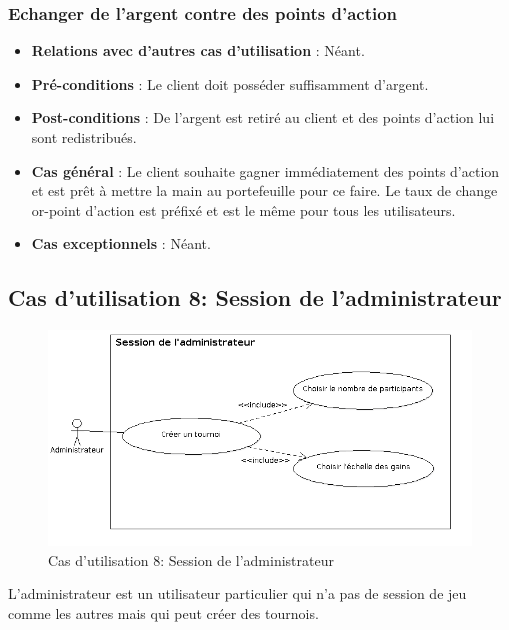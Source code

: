 \documentclass[a4paper,titlepage]{scrreprt}
\begin{document}
    \subsubsection{Echanger de l'argent contre des points d'action}
      \begin{itemize}
        \item \textbf{Relations avec d'autres cas d'utilisation}  : Néant.
        \item \textbf{Pré-conditions} : Le client doit posséder suffisamment d'argent.
        \item \textbf{Post-conditions} : De l'argent est retiré au client et des points d'action lui sont redistribués.
        \item \textbf{Cas général} : Le client souhaite gagner immédiatement des points d'action et est prêt à mettre la main au portefeuille pour ce faire. Le taux de change or-point d'action est préfixé et est le même pour tous les utilisateurs.
        \item \textbf{Cas exceptionnels} : Néant.
      \end{itemize}


  \subsection{Cas d'utilisation 8: Session de l'administrateur}
  \begin{figure}[H]
    \center
    \includegraphics[scale=0.5]{uml/useCaseView/SessionAdmin.png}
    \caption{Cas d'utilisation 8: Session de l'administrateur}
  \end{figure}  
    L'administrateur est un utilisateur particulier qui n'a pas de session de jeu comme les autres mais qui peut créer des tournois.
\end{document}
